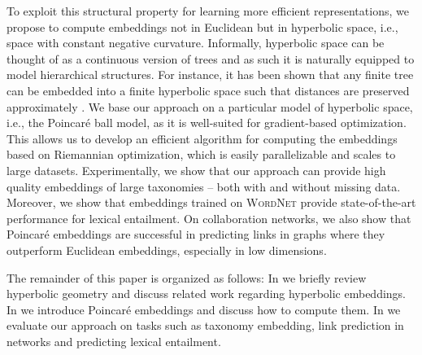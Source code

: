 \documentclass[11pt]{article}
\newcommand{\method}[1]{\textsc{#1}\xspace}
\begin{document}
To exploit this structural property for learning more efficient representations,
we propose to compute embeddings not in Euclidean but in hyperbolic space, i.e.,
space with constant negative curvature. Informally, hyperbolic space can be
thought of as a continuous version of trees and as such it is naturally equipped
to model hierarchical structures. For instance, it has been shown that any
finite tree can be embedded into a finite hyperbolic space such that distances
are preserved approximately \cite{gromov1987hyperbolic}. We base our approach on a
particular model of hyperbolic space, i.e., the Poincaré ball model, as it is
well-suited for gradient-based optimization. This allows us to develop an
efficient algorithm for computing the embeddings based on Riemannian
optimization, which is easily parallelizable and scales to large datasets.
Experimentally, we show that our approach can provide high quality embeddings of
large taxonomies -- both with and without missing data. Moreover, we show that
embeddings trained on \method{WordNet} provide state-of-the-art performance for
lexical entailment. On collaboration networks, we also show that Poincaré
embeddings are successful in predicting links in graphs where they outperform
Euclidean embeddings, especially in low dimensions.

The remainder of this paper is organized as follows: In  we
briefly review hyperbolic geometry and discuss related work regarding hyperbolic
embeddings. In  we introduce Poincaré embeddings and discuss
how to compute them. In  we evaluate our approach on tasks
such as taxonomy embedding, link prediction in networks and predicting lexical entailment.
\end{document}
